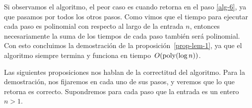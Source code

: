 	
	
	Si observamos el algoritmo, el peor caso es cuando retorna en el paso \ref{alg-6}, ya que pasamos por todos los otros pasos. Como vimos que el tiempo para ejecutar cada paso es polinomial con respecto al largo de la entrada $n$, entonces necesariamente la suma de los tiempos de cada paso también será polinomial. Con esto concluimos la demostración de la
        proposición~\ref{prop-lem-1},
        ya que 
	el algoritmo siempre termina y funciona en tiempo~$O({\rm poly}(\log n))$.
	
	Las siguientes proposiciones nos hablan de la correctitud del algoritmo. Para la demostración, nos fijaremos en cada uno de sus pasos, y veremos que lo que retorna es correcto.
	Supondremos para cada paso que la entrada es un entero $n>1$.
	
